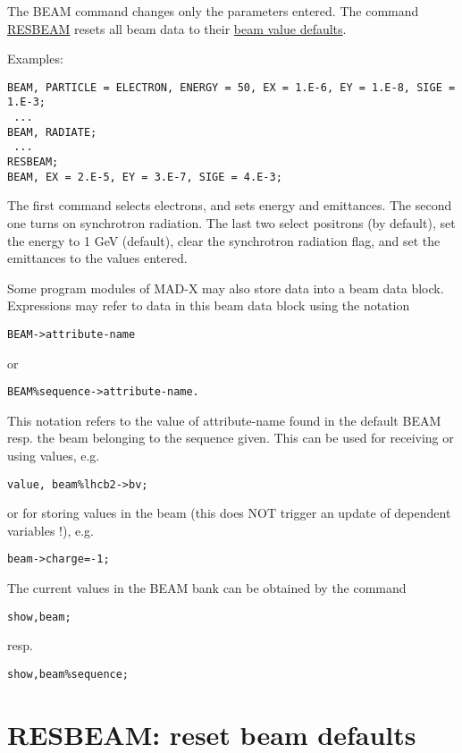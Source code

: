The BEAM command changes only the parameters entered. The command
\href{resbeam.html}{RESBEAM} resets all beam data to their
\href{resbeam.html#defaults}{beam value defaults}.  

Examples: 
\begin{verbatim}
BEAM, PARTICLE = ELECTRON, ENERGY = 50, EX = 1.E-6, EY = 1.E-8, SIGE = 1.E-3;
 ...
BEAM, RADIATE;
 ...
RESBEAM;
BEAM, EX = 2.E-5, EY = 3.E-7, SIGE = 4.E-3;
\end{verbatim} 

The first command selects electrons, and sets energy and emittances. The
second one turns on synchrotron radiation. The last two select positrons
(by default), set the energy to 1 GeV (default), clear the synchrotron
radiation flag, and set the emittances to the values entered.  

Some program modules of MAD-X may also store data into a beam data
block. Expressions may refer to data in this beam data block using the
notation  
\begin{verbatim}
BEAM->attribute-name
\end{verbatim} 
or 
\begin{verbatim}
BEAM%sequence->attribute-name.
\end{verbatim} 

This notation refers to the value of attribute-name found in the default
BEAM resp. the beam belonging to the sequence given. This can be used
for receiving or using values, e.g. 

\begin{verbatim}
value, beam%lhcb2->bv;
\end{verbatim} 
or for storing values in the beam (this does NOT trigger an update of
dependent variables !), e.g.  
\begin{verbatim}
beam->charge=-1;
\end{verbatim} 

The current values in the BEAM bank can be obtained by the command
\begin{verbatim}
show,beam;
\end{verbatim}
resp.
\begin{verbatim}
show,beam%sequence;
\end{verbatim}


%
\section{RESBEAM: reset beam defaults}
\label{sec:resbeam}

